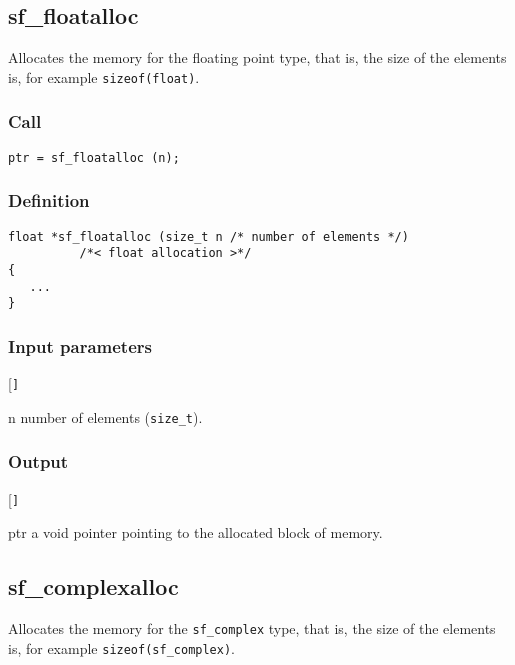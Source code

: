 \subsection{{sf\_floatalloc}}\label{sec:sf_floatalloc}
Allocates the memory for  the floating point type, that is,  the size of the elements is, for example \texttt{sizeof(float)}. 

\subsubsection*{Call}
\begin{verbatim}ptr = sf_floatalloc (n);\end{verbatim}

\subsubsection*{Definition}
\begin{verbatim}
float *sf_floatalloc (size_t n /* number of elements */)
          /*< float allocation >*/ 
{
   ...
}
\end{verbatim}

\subsubsection*{Input parameters}
\begin{desclist}{\tt }{\quad}[\tt ]
   \setlength\itemsep{0pt}
   \item[n] number of elements (\texttt{size\_t}).
\end{desclist}

\subsubsection*{Output}
\begin{desclist}{\tt }{\quad}[\tt ]
   \setlength\itemsep{0pt}
   \item[ptr] a void pointer pointing to the allocated block of memory.
\end{desclist}




\subsection{{sf\_complexalloc}}\label{sec:sf_complexalloc}
Allocates the memory for the \texttt{sf\_complex} type, that is, the size of the elements is, for example \texttt{sizeof(sf\_complex)}. 


